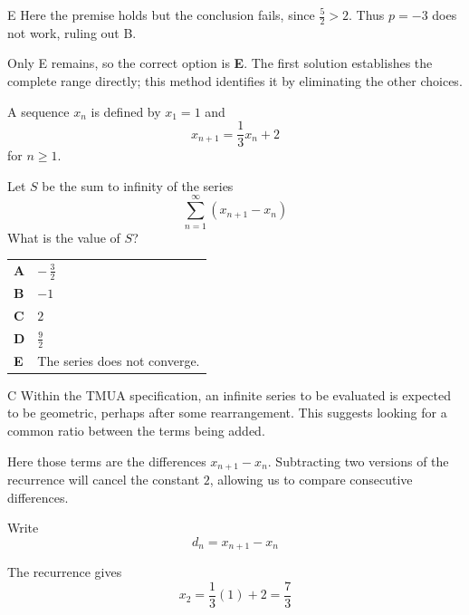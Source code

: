 \documentclass[11pt,a4paper]{article}
\begin{document}
\begin{enumerate}[label=\textbf{\arabic*.},leftmargin=*,itemsep=0pt,start=17]
\begin{djsSolution}{E}
Here the premise holds but the conclusion fails, since $\frac52>2$. Thus $p=-3$ does not work, ruling out B.

Only E remains, so the correct option is \textbf{E}. The first solution establishes the complete range directly; this method identifies it by eliminating the other choices.
\end{djsSolution}
\end{enumerate}
\clearpage
\thispagestyle{djssolutions}
\vspace*{8pt}
\begin{enumerate}[label=\textbf{\arabic*.},leftmargin=*,itemsep=0pt,start=18]
A sequence $x_n$ is defined by $x_1=1$ and \[x_{n+1}=\frac{1}{3}x_n+2\] for $n\ge 1$.

Let $S$ be the sum to infinity of the series \[ \sum_{n=1}^{\infty} \left(x_{n+1}-x_n\right) \] What is the value of $S$?

\par\vspace*{12pt}
\begin{tabularx}{\linewidth}{@{}>{\bfseries}l Y@{}}
A &
$-\,\frac{3}{2}$
\\[0.8em]
B &
$-1$
\\[0.8em]
C &
$2$
\\[0.8em]
D &
$\frac{9}{2}$
\\[0.8em]
E &
The series does not converge.
\\
\end{tabularx}

\begin{djsSolution}{C}
Within the TMUA specification, an infinite series to be evaluated is expected to be geometric, perhaps after some rearrangement. This suggests looking for a common ratio between the terms being added.

Here those terms are the differences $x_{n+1}-x_n$. Subtracting two versions of the recurrence will cancel the constant $2$, allowing us to compare consecutive differences.

Write
\[
d_n=x_{n+1}-x_n
\]

The recurrence gives
\[
x_2=\frac13(1)+2=\frac73
\]


\end{djsSolution}
\end{enumerate}
\end{document}
